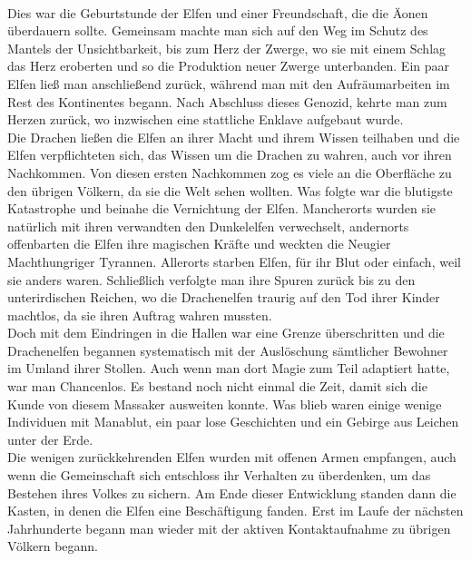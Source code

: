 \documentclass[a4paper,12pt,oneside]{book}
\begin{document}
\\Dies war die Geburtstunde der Elfen und einer Freundschaft, die die Äonen überdauern sollte. Gemeinsam machte man sich auf den Weg im Schutz des Mantels der Unsichtbarkeit, bis zum Herz der Zwerge, wo sie mit einem Schlag das Herz eroberten und so die Produktion neuer Zwerge unterbanden. Ein paar Elfen ließ man anschließend zurück, während man mit den Aufräumarbeiten im Rest des Kontinentes begann. Nach Abschluss dieses Genozid, kehrte man zum Herzen zurück, wo inzwischen eine stattliche Enklave aufgebaut wurde. 
\\Die Drachen ließen die Elfen an ihrer Macht und ihrem Wissen teilhaben und die Elfen verpflichteten sich, das Wissen um die Drachen zu wahren, auch vor ihren Nachkommen. Von diesen ersten Nachkommen zog es viele an die Oberfläche zu den übrigen Völkern, da sie die Welt sehen wollten. Was folgte war die blutigste Katastrophe und beinahe die Vernichtung der Elfen. Mancherorts wurden sie natürlich mit ihren verwandten den Dunkelelfen verwechselt, andernorts offenbarten die Elfen ihre magischen Kräfte und weckten die Neugier Machthungriger Tyrannen. Allerorts starben Elfen, für ihr Blut oder einfach, weil sie anders waren. Schließlich verfolgte man ihre Spuren zurück bis zu den unterirdischen Reichen, wo die Drachenelfen traurig auf den Tod ihrer Kinder machtlos, da sie ihren Auftrag wahren mussten.
\\Doch mit dem Eindringen in die Hallen war eine Grenze überschritten und die Drachenelfen begannen systematisch mit der Auslöschung sämtlicher Bewohner im Umland ihrer Stollen. Auch wenn man dort Magie zum Teil adaptiert hatte, war man Chancenlos. Es bestand noch nicht einmal die Zeit, damit sich die Kunde von diesem Massaker ausweiten konnte. Was blieb waren einige wenige Individuen mit Manablut, ein paar lose Geschichten und ein Gebirge aus Leichen unter der Erde.
\\Die wenigen zurückkehrenden Elfen wurden mit offenen Armen empfangen, auch wenn die Gemeinschaft sich entschloss ihr Verhalten zu überdenken, um das Bestehen ihres Volkes zu sichern. Am Ende dieser Entwicklung standen dann die Kasten, in denen die Elfen eine Beschäftigung fanden. Erst im Laufe der nächsten Jahrhunderte begann man wieder mit der aktiven Kontaktaufnahme zu übrigen Völkern begann.
\end{document}
